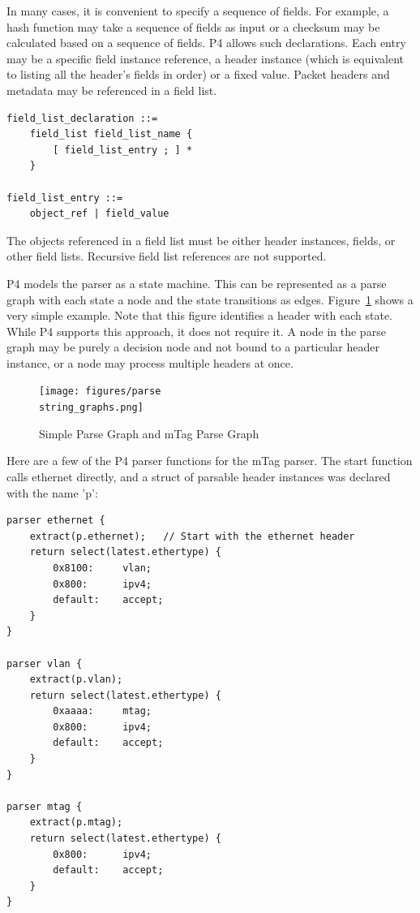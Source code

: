 \documentclass[12pt]{article}
\begin{document}

In many cases, it is convenient to specify a sequence of fields. For example, 
a hash function may take a sequence of fields as input or a checksum may be 
calculated based on a sequence of fields.  P4 allows such declarations. Each 
entry may be a specific field instance reference, a header instance (which 
is equivalent to listing all the header's fields in order) or a fixed value. 
Packet headers and metadata may be referenced in a field list.

\begin{lstlisting}[style=BNFstyle]
field_list_declaration ::=
    field_list field_list_name {
        [ field_list_entry ; ] *
    }

field_list_entry ::= 
    object_ref | field_value
\end{lstlisting}

The objects referenced in a field list must be either header instances,
fields, or other field lists. Recursive field list references are not
supported.


P4 models the parser as a state machine. This can be represented as a parse
graph with each state a node and the state transitions as edges.
Figure~\ref{fig:parsegraphs} shows a very simple example. Note that this figure
identifies a header with each state. While P4 supports this approach, it does
not require it. A node in the parse graph may be purely a decision node and not
bound to a particular header instance, or a node may process multiple headers
at once.



\begin{figure}[h!]
    \centering
    \texttt{[image: figures/parse\\string\_graphs.png]}
    \caption{Simple Parse Graph and mTag Parse Graph}
    \label{fig:parsegraphs}
\end{figure}


Here are a few of the P4 parser functions for the mTag parser. The 
start function calls ethernet directly, and a struct of parsable header
instances was declared with the name 'p':

\begin{lstlisting}[style=P4style]
parser ethernet {
    extract(p.ethernet);   // Start with the ethernet header
    return select(latest.ethertype) {
        0x8100:     vlan;
        0x800:      ipv4;
        default:    accept;
    }
}

parser vlan {
    extract(p.vlan);
    return select(latest.ethertype) {
        0xaaaa:     mtag;
        0x800:      ipv4;
        default:    accept;
    }
}

parser mtag {
    extract(p.mtag);
    return select(latest.ethertype) {
        0x800:      ipv4;
        default:    accept;
    }
}
\end{lstlisting}
\end{document}
